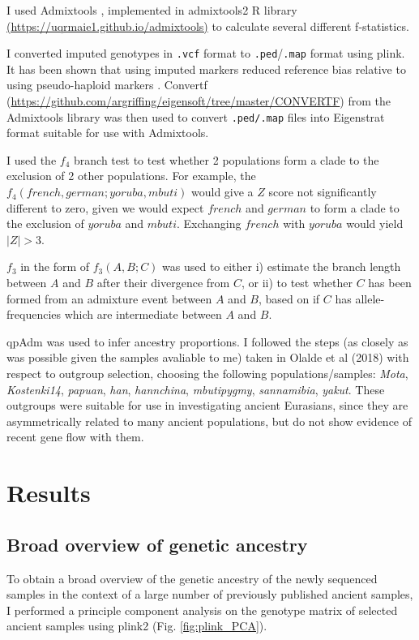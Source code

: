 I used Admixtools \cite{Patterson2012}, implemented in admixtools2 R library \url{(https://uqrmaie1.github.io/admixtools)} to calculate several different f-statistics. 

I converted imputed genotypes in \texttt{.vcf} format to \texttt{.ped}/\texttt{.map} format using plink. It has been shown that using imputed markers reduced reference bias relative to using pseudo-haploid markers \cite{Martiniano2017}. Convertf (\url{https://github.com/argriffing/eigensoft/tree/master/CONVERTF}) from the Admixtools library was then used to convert \texttt{.ped/.map} files into Eigenstrat format suitable for use with Admixtools. 

I used the $f_{4}$ branch test to test whether 2 populations form a clade to the exclusion of 2 other populations. For example, the $f_{4}(french,german;yoruba,mbuti)$ would give a $Z$ score not significantly different to zero, given we would expect $french$ and $german$ to form a clade to the exclusion of $yoruba$ and $mbuti$. Exchanging $french$ with $yoruba$ would yield $|Z| > 3$.

$f_{3}$ in the form of $f_{3}(A,B;C)$ was used to either i) estimate the branch length between $A$ and $B$ after their divergence from $C$, or ii) to test whether $C$ has been formed from an admixture event between $A$ and $B$, based on if $C$ has allele-frequencies which are intermediate between $A$ and $B$.

qpAdm was used to infer ancestry proportions. I followed the steps (as closely as was possible given the samples avaliable to me) taken in Olalde et al (2018) with respect to outgroup selection, choosing the following populations/samples: \textit{Mota}, \textit{Kostenki14}, \textit{papuan}, \textit{han}, \textit{hannchina}, \textit{mbutipygmy}, \textit{sannamibia}, \textit{yakut}. These outgroups were suitable for use in investigating ancient Eurasians, since they are asymmetrically related to many ancient populations, but do not show evidence of recent gene flow with them. 

\section{Results}

\subsection{Broad overview of genetic ancestry}

To obtain a broad overview of the genetic ancestry of the newly sequenced samples in the context of a large number of previously published ancient samples, I performed a principle component analysis on the genotype matrix of selected ancient samples using plink2 (Fig. \ref{fig:plink_PCA}). 

